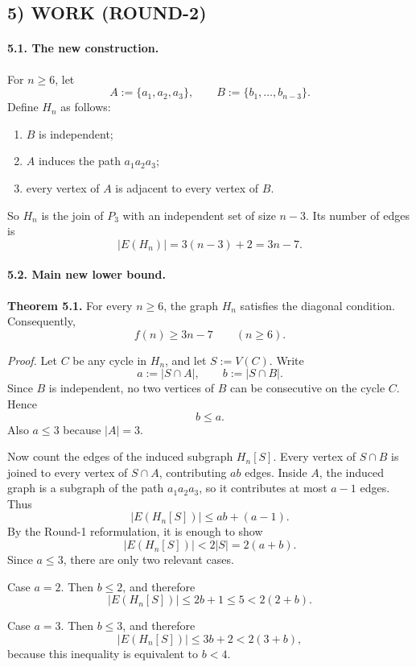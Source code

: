 \subsection*{5) WORK (ROUND-2)}

\paragraph{5.1. The new construction.}
For $n\ge 6$, let
\[
A:=\{a_1,a_2,a_3\},\qquad B:=\{b_1,\dots,b_{n-3}\}.
\]
Define $H_n$ as follows:

\begin{enumerate}
\item $B$ is independent;
\item $A$ induces the path $a_1a_2a_3$;
\item every vertex of $A$ is adjacent to every vertex of $B$.
\end{enumerate}

So $H_n$ is the join of $P_3$ with an independent set of size $n-3$.
Its number of edges is
\[
|E(H_n)|=3(n-3)+2=3n-7.
\]

\paragraph{5.2. Main new lower bound.}
\textbf{Theorem 5.1.}
For every $n\ge 6$, the graph $H_n$ satisfies the diagonal condition. Consequently,
\[
f(n)\ge 3n-7\qquad (n\ge 6).
\]

\textit{Proof.}
Let $C$ be any cycle in $H_n$, and let $S:=V(C)$. Write
\[
a:=|S\cap A|,\qquad b:=|S\cap B|.
\]
Since $B$ is independent, no two vertices of $B$ can be consecutive on the cycle $C$. Hence
\[
b\le a.
\]
Also $a\le 3$ because $|A|=3$.

Now count the edges of the induced subgraph $H_n[S]$.
Every vertex of $S\cap B$ is joined to every vertex of $S\cap A$, contributing $ab$ edges. Inside $A$, the induced graph is a subgraph of the path $a_1a_2a_3$, so it contributes at most $a-1$ edges. Thus
\[
|E(H_n[S])|\le ab+(a-1).
\]
By the Round-1 reformulation, it is enough to show
\[
|E(H_n[S])|<2|S|=2(a+b).
\]
Since $a\le 3$, there are only two relevant cases.

\smallskip
\noindent
Case $a=2$. Then $b\le 2$, and therefore
\[
|E(H_n[S])|\le 2b+1\le 5<2(2+b).
\]

\smallskip
\noindent
Case $a=3$. Then $b\le 3$, and therefore
\[
|E(H_n[S])|\le 3b+2<2(3+b),
\]
because this inequality is equivalent to $b<4$.

